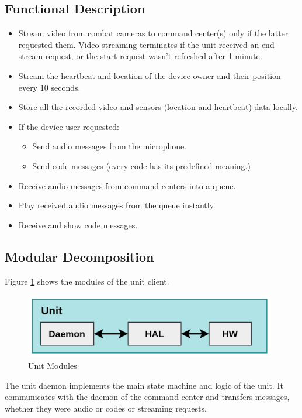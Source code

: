 \subsection{Functional Description}
\begin{itemize}[itemsep=1pt, topsep=5pt]
    \item Stream video from combat cameras to command center(s) only if the latter requested them. Video streaming terminates if the unit received an end-stream request, or the start request wasn’t refreshed after 1 minute.
    \item Stream the heartbeat and location of the device owner and their position every 10 seconds.
    \item Store all the recorded video and sensors (location and heartbeat) data locally.
    \item If the device user requested:
        \begin{itemize}[itemsep=1pt, topsep=5pt]
            \item Send audio messages from the microphone.
            \item Send code messages (every code has its predefined meaning.)
        \end{itemize}
    \item Receive audio messages from command centers into a queue.
    \item Play received audio messages from the queue instantly.
    \item Receive and show code messages.
\end{itemize}

\subsection{Modular Decomposition}
Figure \ref{fig:unit-modules} shows the modules of the unit client.

\begin{figure}[!htb]
    \centering
    \includegraphics[width=11cm]{images/unit-modules.png}
    \caption{Unit Modules}
    \label{fig:unit-modules}
\end{figure}

The unit daemon implements the main state machine and logic of the unit.
It communicates with the daemon of the command center and transfers messages, whether they were audio or codes or streaming requests.

